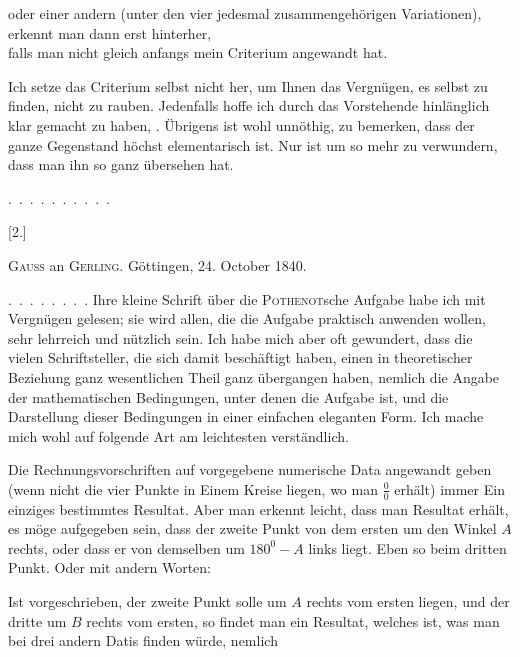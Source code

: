 oder einer andern (unter den vier jedesmal zusammengehörigen Variationen),
erkennt man dann erst hinterher,\\\hspace*{2em}falls man nicht gleich anfangs mein
Criterium angewandt hat.

Ich setze das Criterium selbst nicht her, um Ihnen das Vergnügen, es selbst
zu finden, nicht zu rauben. Jedenfalls hoffe ich durch das Vorstehende
hinlänglich klar gemacht zu haben, . Übrigens ist wohl
unnöthig, zu bemerken, dass der ganze Gegenstand höchst elementarisch ist.
Nur ist um so mehr zu verwundern, dass man ihn so ganz übersehen hat.

\mbox{. . . . . . . . . .}

\begin{center}[2.]\end{center}

\begin{center}\textsc{Gauss} an \textsc{Gerling}. Göttingen, 24. October 1840.\end{center}

\indent \mbox{. . . . . . . .} Ihre kleine Schrift über die \textsc{Pothenot}sche Aufgabe habe ich
mit Vergnügen gelesen; sie wird allen, die die Aufgabe praktisch anwenden
wollen, sehr lehrreich und nützlich sein. Ich habe mich aber oft gewundert,
dass die vielen Schriftsteller, die sich damit beschäftigt haben, einen in
theoretischer Beziehung ganz wesentlichen Theil ganz übergangen haben,
nemlich die Angabe der mathematischen Bedingungen, unter denen die Aufgabe
 ist, und die Darstellung dieser Bedingungen in einer
einfachen eleganten Form. Ich mache mich wohl auf folgende Art am
leichtesten verständlich.

Die Rechnungsvorschriften auf vorgegebene numerische Data angewandt geben
(wenn nicht die vier Punkte in Einem Kreise liegen, wo man $\frac{0}{0}$
erhält) immer Ein einziges bestimmtes Resultat. Aber man erkennt leicht,
dass man  Resultat erhält, es möge aufgegeben sein, dass der zweite
Punkt von dem ersten um den Winkel $A$ rechts, oder dass er von demselben um
$180^0-A$ links liegt. Eben so beim dritten Punkt. Oder mit andern Worten:

Ist vorgeschrieben, der zweite Punkt solle um $A$ rechts vom ersten liegen,
und der dritte um $B$ rechts vom ersten, so findet man ein Resultat, welches
 ist, was man bei drei andern Datis finden würde, nemlich
